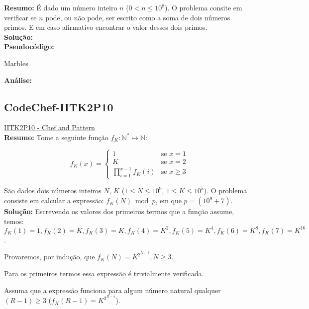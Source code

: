 \textbf{Resumo:}
É dado um número inteiro $n$ ($0 < n \leq 10^8$). O problema consite em verificar se $n$ pode, ou não pode, ser escrito como a soma de dois números primos.
E em caso afirmativo encontrar o valor desses dois primos.
\\

\textbf{Solução:}
\\

\textbf{Pseudocódigo:}
\begin{algorithm}
\caption{Marbles}
\begin{algorithmic}[1]

\EndProcedure
\end{algorithmic}
\end{algorithm}


\textbf{Análise:}



\subsection{CodeChef-IITK2P10}
\href{https://www.codechef.com/problems/IITK2P10}{IITK2P10 - Chef and Pattern}\\


\textbf{Resumo:}
Tome a seguinte função $f_K:\mathbb{N}^* \longmapsto \mathbb{N}$:

\[
 f_K(x) = 
  \begin{cases} 
   1 & \text{se } x = 1 \\
   K & \text{se } x = 2 \\
   \prod_{i=1}^{x-1}f_K(i) & \text{se } x \geq 3
  \end{cases}
\]

São dados dois números inteiros $N$, $K$ ($1 \leq N \leq 10^9$, $1 \leq K \leq 10^5$). O problema consiste em calcular a expressão: $f_K(N) \bmod p$, em que $p = (10^9+7)$.
\\

\textbf{Solução:}
Escrevendo os valores dos primeiros termos que a função assume, temos: $f_K(1)=1, f_K(2)=K, f_K(3)=K, f_K(4)=K^2, f_K(5)=K^4, f_K(6)=K^8, f_K(7)=K^{16}$.

Provaremos, por indução, que $f_K(N) = K^{2^{N-3}}, N \geq 3$.

Para os primeiros termos essa expressão é trivialmente verificada.

Assuma que a expressão funciona para algum número natural qualquer $(R-1) \geq 3$ ($f_K(R-1) = K^{2^{R-4}}$).

